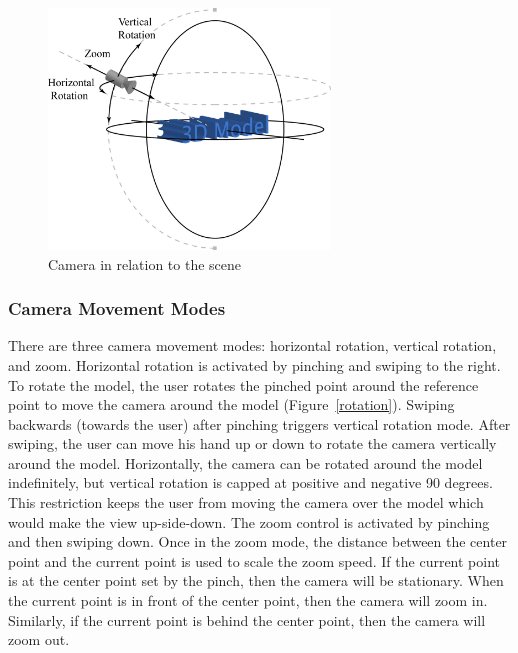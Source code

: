 \documentclass[a4paper,twoside]{article}
\begin{document}
\begin{figure}[h] \begin{center} \includegraphics[width = 7.5cm]{Camera}
\end{center} \caption{Camera in relation to the scene} \label{camera}
\end{figure}


\subsubsection{Camera Movement Modes} There are three camera movement modes:
horizontal rotation, vertical rotation, and zoom. Horizontal rotation is
activated by pinching and swiping to the right. To rotate the model, the user
rotates the pinched point around the reference point to move the camera around
the model (Figure~\ref{rotation}). Swiping backwards (towards the user) after
pinching triggers vertical rotation mode. After swiping, the user can move his
hand up or down to rotate the camera vertically around the model.
Horizontally, the camera can be rotated around the model indefinitely, but
vertical rotation is capped at positive and negative 90 degrees. This
restriction keeps the user from moving the camera over the model which would
make the view up-side-down. The zoom control is activated by pinching and then
swiping down.  Once in the zoom mode, the distance between the center point and
the current point is used to scale the zoom speed. If the current point is at
the center point set by the pinch, then the camera will be stationary. When the
current point is in front of the center point, then the camera will zoom in.
Similarly, if the current point is behind the center point, then the camera
will zoom out.

 
\end{document}
